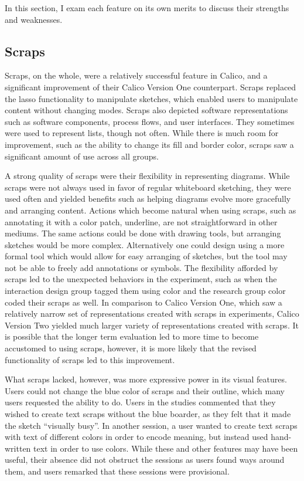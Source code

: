 In this section, I exam each feature on its own merits to discuss their strengths and weaknesses.

\subsection{Scraps}
Scraps, on the whole, were a relatively successful feature in Calico, and a significant improvement of their Calico Version One counterpart. Scraps replaced the lasso functionality to manipulate sketches, which enabled users to manipulate content without changing modes. Scraps also depicted software representations such as software components, process flows, and user interfaces. They sometimes were used to represent lists, though not often. While there is much room for improvement, such as the ability to change its fill and border color, scraps saw a significant amount of use across all groups. 

A strong quality of scraps were their flexibility in representing diagrams. While scraps were not always used in favor of regular whiteboard sketching, they were used often and yielded benefits such as helping diagrams evolve more gracefully and arranging content. Actions which become natural when using scraps, such as annotating it with a color patch, underline, are not straightforward in other mediums. The same actions could be done with drawing tools, but arranging sketches would be more complex. Alternatively one could design using a more formal tool which would allow for easy arranging of sketches, but the tool may not be able to freely add annotations or symbols. The flexibility afforded by scraps led to the unexpected behaviors in the experiment, such as when the interaction design group tagged them using color and the research group color coded their scraps as well. In comparison to Calico Version One, which saw a relatively narrow set of representations created with scraps in experiments, Calico Version Two yielded much larger variety of representations created with scraps. It is possible that the longer term evaluation led to more time to become accustomed to using scraps, however, it is more likely that the revised functionality of scraps led to this improvement.

What scraps lacked, however, was more expressive power in its visual features. Users could not change the blue color of scraps and their outline, which many users requested the ability to do. Users in the studies commented that they wished to create text scraps without the blue boarder, as they felt that it made the sketch ``visually busy''. In another session, a user wanted to create text scraps with text of different colors in order to encode meaning, but instead used hand-written text in order to use colors. While these and other features may have been useful, their absence did not obstruct the sessions as users found ways around them, and users remarked that these sessions were provisional.

